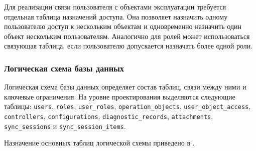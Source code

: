 Для реализации связи пользователя с объектами эксплуатации требуется отдельная
таблица назначений доступа. Она позволяет назначить одному пользователю доступ к
нескольким объектам и одновременно назначить один объект нескольким
пользователям. Аналогично для ролей может использоваться связующая таблица,
если пользователю допускается назначать более одной роли.

\subsubsection{Логическая схема базы данных}

Логическая схема базы данных определяет состав таблиц, связи между ними и
ключевые ограничения. На уровне проектирования выделяются следующие таблицы:
\texttt{users}, \texttt{roles}, \texttt{user\_roles},
\texttt{operation\_objects}, \texttt{user\_object\_access},
\texttt{controllers}, \texttt{configurations}, \texttt{diagnostic\_records},
\texttt{attachments}, \texttt{sync\_sessions} и
\texttt{sync\_session\_items}.

Назначение основных таблиц логической схемы приведено в
.

